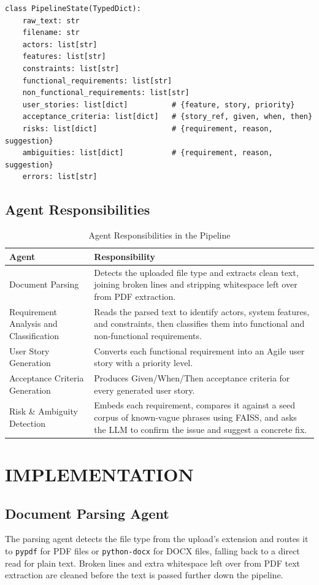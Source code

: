 \documentclass[12pt,a4paper,openany]{report}
\begin{document}
\begin{lstlisting}
class PipelineState(TypedDict):
    raw_text: str
    filename: str
    actors: list[str]
    features: list[str]
    constraints: list[str]
    functional_requirements: list[str]
    non_functional_requirements: list[str]
    user_stories: list[dict]          # {feature, story, priority}
    acceptance_criteria: list[dict]   # {story_ref, given, when, then}
    risks: list[dict]                 # {requirement, reason, suggestion}
    ambiguities: list[dict]           # {requirement, reason, suggestion}
    errors: list[str]
\end{lstlisting}

\section{Agent Responsibilities}
\begin{longtable}{|p{3.3cm}|p{9.8cm}|}
\caption{Agent Responsibilities in the Pipeline}\\
\hline
\textbf{Agent} & \textbf{Responsibility} \\
\hline
Document Parsing & Detects the uploaded file type and extracts clean text, joining broken lines and stripping whitespace left over from PDF extraction. \\
\hline
Requirement Analysis and Classification & Reads the parsed text to identify actors, system features, and constraints, then classifies them into functional and non-functional requirements. \\
\hline
User Story Generation & Converts each functional requirement into an Agile user story with a priority level. \\
\hline
Acceptance Criteria Generation & Produces Given/When/Then acceptance criteria for every generated user story. \\
\hline
Risk \& Ambiguity Detection & Embeds each requirement, compares it against a seed corpus of known-vague phrases using FAISS, and asks the LLM to confirm the issue and suggest a concrete fix. \\
\hline
\end{longtable}

\FloatBarrier

\chapter{IMPLEMENTATION}

\section{Document Parsing Agent}
The parsing agent detects the file type from the upload's extension and
routes it to \texttt{pypdf} for PDF files or \texttt{python-docx} for DOCX
files, falling back to a direct read for plain text. Broken lines and
extra whitespace left over from PDF text extraction are cleaned before the
text is passed further down the pipeline.
\end{document}
